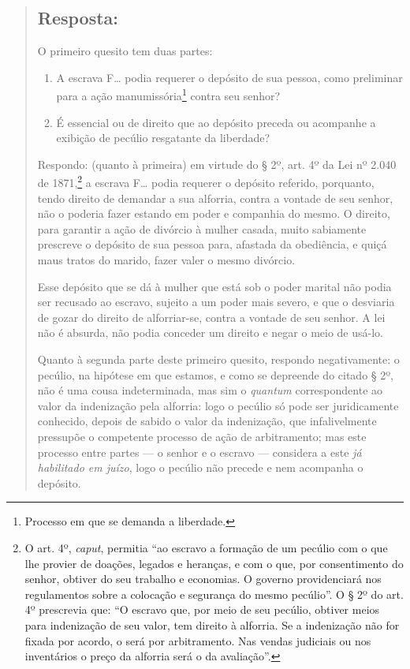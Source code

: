 \begin{quote}
\subsection{Resposta:}

O primeiro quesito tem duas partes:

\begin{enumerate}[label=\arabic*º]
\item A escrava F\ldots{} podia requerer o depósito de sua pessoa, como
preliminar para a ação manumissória\footnote{ Processo em que se
  demanda a liberdade.} contra seu senhor?

\item É essencial ou de direito que ao depósito preceda ou acompanhe a
exibição de pecúlio resgatante da liberdade?
\end{enumerate}

Respondo: (quanto à primeira) em virtude do § 2º, art. 4º da Lei nº
2.040 de 1871,\footnote{ O art. 4º, \emph{caput}, permitia ``ao escravo
  a formação de um pecúlio com o que lhe provier de doações, legados e
  heranças, e com o que, por consentimento do senhor, obtiver do seu
  trabalho e economias. O governo providenciará nos regulamentos sobre a
  colocação e segurança do mesmo pecúlio''. O § 2º do art. 4º prescrevia
  que: ``O escravo que, por meio de seu pecúlio, obtiver meios para
  indenização de seu valor, tem direito à alforria. Se a indenização não
  for fixada por acordo, o será por arbitramento. Nas vendas judiciais
  ou nos inventários o preço da alforria será o da avaliação''.} a
escrava F\ldots{} podia requerer o depósito referido, porquanto, tendo
direito de demandar a sua alforria, contra a vontade de seu senhor, não
o poderia fazer estando em poder e companhia do mesmo. O direito, para
garantir a ação de divórcio à mulher casada, muito sabiamente prescreve
o depósito de sua pessoa para, afastada da obediência, e quiçá maus
tratos do marido, fazer valer o mesmo divórcio.

Esse depósito que se dá à mulher que está sob o poder marital não podia
ser recusado ao escravo, sujeito a um poder mais severo, e que o
desviaria de gozar do direito de alforriar-se, contra a vontade de seu
senhor. A lei não é absurda, não podia conceder um direito e negar o
meio de usá-lo.

Quanto à segunda parte deste primeiro quesito, respondo negativamente: o
pecúlio, na hipótese em que estamos, e como se depreende do citado § 2º,
não é uma cousa indeterminada, mas sim o \emph{quantum} correspondente
ao valor da indenização pela alforria: logo o pecúlio só pode ser
juridicamente conhecido, depois de sabido o valor da indenização, que
infalivelmente pressupõe o competente processo de ação de arbitramento;
mas este processo entre partes --- o senhor e o escravo --- considera a
este \emph{já habilitado em juízo}, logo o pecúlio não precede e nem
acompanha o depósito.


\end{quote}
